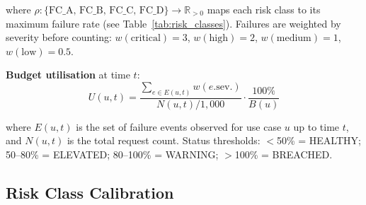 \documentclass{article}
\begin{document}
where $\rho : \{\text{FC\_A, FC\_B, FC\_C, FC\_D}\} \to \mathbb{R}_{>0}$
maps each risk class to its maximum failure rate (see Table~\ref{tab:risk_classes}).
Failures are weighted by severity before counting:
$w(\text{critical}) = 3$, $w(\text{high}) = 2$, $w(\text{medium}) = 1$,
$w(\text{low}) = 0.5$.

\textbf{Budget utilisation} at time $t$:
\begin{equation}
  U(u, t) = \frac{\sum_{e \in E(u,t)} w(e.\text{sev.})}{N(u,t) / 1{,}000}
             \cdot \frac{100\%}{B(u)}
  \label{eq:utilisation}
\end{equation}

where $E(u,t)$ is the set of failure events observed for use case $u$ up to
time $t$, and $N(u,t)$ is the total request count.  Status thresholds:
$<$50\% = HEALTHY; 50--80\% = ELEVATED; 80--100\% = WARNING; $>$100\% = BREACHED.

\begin{table}[t]
\caption{Failure budget risk classes, with calibration drawn from regulated
deployment practice \citep{euaiact2024,dora2022,fcaconsumerduty2024}.}
\label{tab:risk_classes}
\centering
\small
{}
\end{table}

\subsection{Risk Class Calibration}
\end{document}
